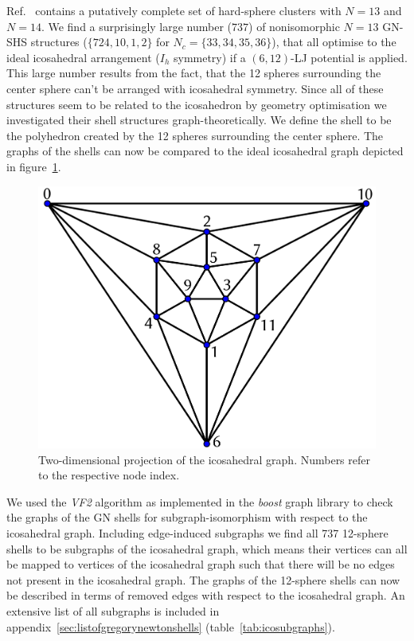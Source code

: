 Ref.~\cite{Holmes-Cerfon_EnumeratingRigidSphere_2016} contains a putatively
complete set of hard-sphere clusters with $N=13$ and $N=14$.  We find a
surprisingly large number ($737$) of nonisomorphic $N = 13$ \ac{GN}-\ac{SHS}
structures ($\{724,10,1,2\}$ for $N_c=\{33,34,35,36\}$), that all optimise to
the ideal icosahedral arrangement ($I_h$ symmetry) if a $(6,12)$-\ac{LJ}
potential is applied. This large number results from the fact, that the 12
spheres surrounding the center sphere can't be arranged with icosahedral
symmetry. Since all of these structures seem to be related to the icosahedron
by geometry optimisation we investigated their shell structures
graph-theoretically. We define the shell to be the polyhedron created by the 12
spheres surrounding the center sphere. The graphs of the shells can now be
compared to the ideal icosahedral graph depicted in figure~\ref{fig:icograph}.

\begin{figure}
    \centering
    \includegraphics[width=.8\textwidth]{gregory-newton/ico.pdf}
    \caption{Two-dimensional projection of the icosahedral graph. Numbers refer
    to the respective node index.}
    \label{fig:icograph}
\end{figure}

We used the \textit{VF2} algorithm\autocite{Cordella_SubGraphIsomorphism_2004}
as implemented in the \textit{boost} graph library\autocite{_boost_2002} to
check the graphs of the \ac{GN} shells for subgraph-isomorphism with respect to
the icosahedral graph. Including edge-induced subgraphs we find all 737
12-sphere shells to be subgraphs of the icosahedral graph, which means their
vertices can all be mapped to vertices of the icosahedral graph such that there
will be no edges not present in the icosahedral graph. The graphs of the
12-sphere shells can now be described in terms of removed edges with respect to
the icosahedral graph. An extensive list of all subgraphs is included in
appendix~\ref{sec:listofgregorynewtonshells} (table~\ref{tab:icosubgraphs}).


